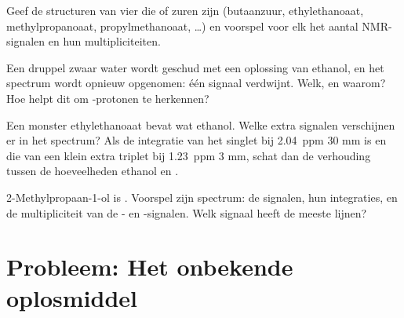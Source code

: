 \begin{exercise}[$\star\star\star$]\label{exo:g12:proton-nmr:12}
Geef de structuren van vier   die  of zuren zijn
(butaanzuur, ethylethanoaat, methylpropanoaat, propylmethanoaat,
\dots) en voorspel voor elk het aantal NMR-signalen en hun
multipliciteiten.
\end{exercise}

\begin{exercise}[$\star\star\star$]\label{exo:g12:proton-nmr:13}
Een druppel zwaar water  wordt geschud met een oplossing van
ethanol, en het spectrum wordt opnieuw opgenomen: één signaal verdwijnt.
Welk, en waarom? Hoe helpt dit om -protonen te herkennen?
\end{exercise}

\begin{exercise}[$\star\star\star$]\label{exo:g12:proton-nmr:14}
Een monster ethylethanoaat bevat wat ethanol. Welke extra signalen
verschijnen er in het spectrum? Als de integratie van het singlet bij
\qty{2.04}{ppm} 30 mm is en die van een klein extra triplet bij
\qty{1.23}{ppm} 3 mm, schat dan de verhouding tussen de hoeveelheden
ethanol en .
\end{exercise}

\begin{exercise}[$\star\star\star$]\label{exo:g12:proton-nmr:15}
2-Methylpropaan-1-ol is . Voorspel zijn spectrum: de
signalen, hun integraties, en de multipliciteit van de - en
-signalen. Welk signaal heeft de meeste lijnen?
\end{exercise}

\section{Probleem: Het onbekende oplosmiddel}

